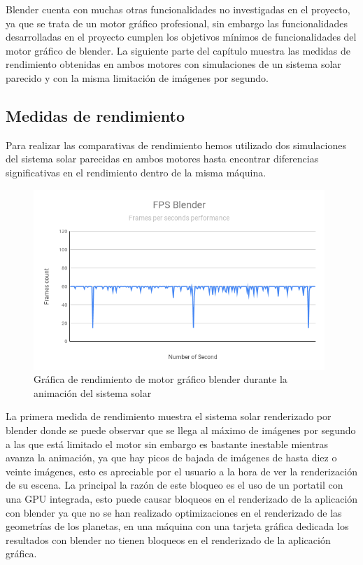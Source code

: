 \documentclass[a4paper]{book}
\begin{document}
Blender cuenta con muchas otras funcionalidades no investigadas en el proyecto, ya que se trata de un motor gráfico profesional,
sin embargo las funcionalidades desarrolladas en el proyecto cumplen los objetivos mínimos de funcionalidades del motor gráfico de blender. La
siguiente parte del capítulo muestra las medidas de rendimiento obtenidas en ambos motores con simulaciones de un sistema solar
parecido y con la misma limitación de imágenes por segundo.

\subsection{Medidas de rendimiento}

Para realizar las comparativas de rendimiento hemos utilizado dos simulaciones del sistema solar parecidas en ambos motores hasta
encontrar diferencias significativas en el rendimiento  dentro de la misma máquina.

\begin{figure}[H]
    \centering
    \includegraphics[width=11cm, keepaspectratio]{img/FPSBlender.png}
    \caption{Gráfica de rendimiento de motor gráfico blender durante la animación del sistema solar}
    \label{FPSBlender}
\end{figure}

La primera medida de rendimiento muestra el sistema solar renderizado por blender donde se puede observar que se llega al máximo de
imágenes por segundo a las que está limitado el motor sin embargo es bastante inestable mientras avanza la animación, ya que hay
picos de bajada de imágenes de hasta diez o veinte imágenes, esto es apreciable por el usuario a la hora de ver la renderización
de su escena. La principal la razón de este bloqueo es el uso de un portatil con una GPU integrada, esto puede causar bloqueos en el 
renderizado de la aplicación con blender ya que no se han realizado optimizaciones en el renderizado de las geometrías de los planetas, 
en una máquina con una tarjeta gráfica dedicada los resultados con blender no tienen bloqueos en el renderizado de la aplicación gráfica.
\end{document}

